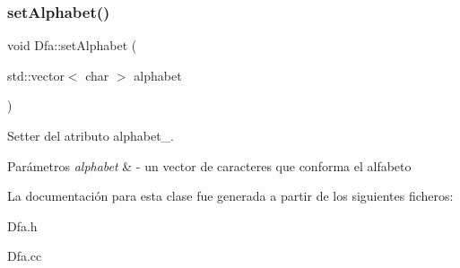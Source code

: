 \subsubsection{\texorpdfstring{set\+Alphabet()}{setAlphabet()}}
{\footnotesize\ttfamily void Dfa\+::set\+Alphabet (\begin{DoxyParamCaption}\item[{std\+::vector$<$ char $>$}]{alphabet }\end{DoxyParamCaption})}



Setter del atributo alphabet\+\_\+. 


\begin{DoxyParams}{Parámetros}
{\em alphabet} & -\/ un vector de caracteres que conforma el alfabeto \\
\hline
\end{DoxyParams}


La documentación para esta clase fue generada a partir de los siguientes ficheros\+:\begin{DoxyCompactItemize}
\item 
Dfa.\+h\item 
Dfa.\+cc\end{DoxyCompactItemize}
